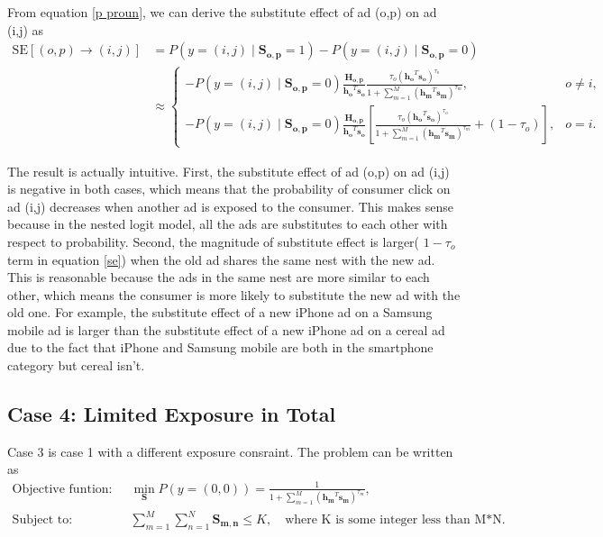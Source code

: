 \documentclass[12pt]{article}
\theoremstyle{definition}
\newcommand{\matr}[1]{\mathbf{#1}} %
\begin{document}
\begin{sloppypar}
From equation \ref{p proun}, we can derive the substitute effect of ad (o,p) on ad (i,j) as
\begin{equation}\label{se}
\begin{aligned}
    \mathrm{SE}[(o,p) \rightarrow (i,j)] &= P(y=(i,j) \mid \matr{S_{o,p}}=1) - P(y=(i,j) \mid \matr{S_{o,p}}=0)  \\
    &\approx 
    \begin{cases}
        -P(y=(i,j) \mid \matr{S_{o,p}} = 0)\frac{\matr{H_{o,p}}}{\matr{h_o}^T \matr{s_o}}\frac{\tau_o(\matr{h_o}^T \matr{s_o})^{\tau_o}}{1+\sum_{m=1}^{M} (\matr{h_m}^T\matr{s_m})^{\tau_m}}, &o \neq i,\\
        -P(y=(i,j) \mid \matr{S_{o,p}} = 0)\frac{\matr{H_{o,p}}}{\matr{h_o}^T \matr{s_o}}[\frac{\tau_o(\matr{h_o}^T\matr{s_o})^{\tau_o}}{1+\sum_{m=1}^{M} (\matr{h_m}^T\matr{s_m})^{\tau_m}}+(1-\tau_o)], &o = i.
    \end{cases}
\end{aligned}
\end{equation}

The result is actually intuitive. First, the substitute effect of ad (o,p) on ad (i,j) is negative in both cases, which means that the probability of consumer click on ad (i,j) decreases when another ad is exposed to the consumer. This makes sense because in the nested logit model, all the ads are substitutes to each other with respect to probability. Second, the magnitude of substitute effect is larger( $1-\tau_o$ term in equation \ref{se}) when the old ad shares the same nest with the new ad. This is reasonable because the ads in the same nest are more similar to each other, which means the consumer is more likely to substitute the new ad with the old one. For example, the substitute effect of a new iPhone ad on a Samsung mobile ad is larger than the substitute effect of a new iPhone ad on a cereal ad due to the fact that iPhone and Samsung mobile are both in the smartphone category but cereal isn't.

\subsection{Case 4: Limited Exposure in Total}
Case 3 is case 1 with a different exposure consraint. The problem can be written as
\begin{align} \label{case4}
    \text{Objective funtion:} \qquad &\min_{\matr{S}} P(y=(0,0)) = \frac{1}{1+\sum_{m=1}^{M}(\matr{h_m}^T \matr{s_m})^{\tau_m}},\nonumber \\
    \text{Subject to:} \qquad &\sum_{m=1}^{M}\sum_{n=1}^{N}\matr{S_{m,n}} \leq K, \quad \text{where K is some integer less than M*N}.
\end{align}


\end{sloppypar}
\end{document}
